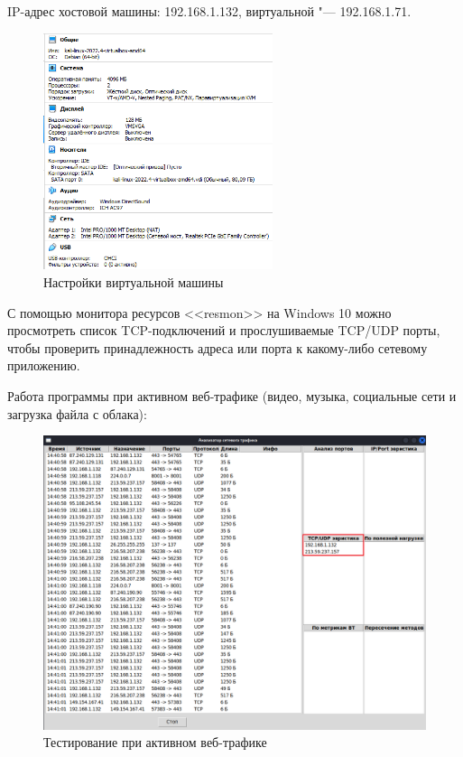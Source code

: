 \documentclass[bachelor, och, coursework]{SCWorks}
\begin{document}
IP-адрес хостовой машины: 192.168.1.132, виртуальной "--- 192.168.1.71.
\begin{figure}[H]
    \centering
    \includegraphics[width=0.6\textwidth]{vbox.png}
    \caption{Настройки виртуальной машины}
\end{figure}

С помощью монитора ресурсов <<resmon>> на Windows 10 можно просмотреть список TCP-подключений и прослушиваемые TCP/UDP порты, чтобы проверить принадлежность адреса или порта к какому-либо сетевому приложению.

Работа программы при активном веб-трафике (видео, музыка, социальные сети и загрузка файла с облака):
\begin{figure}[H]
    \centering
    \includegraphics[width=1\textwidth]{test1.png}
    \caption{Тестирование при активном веб-трафике}
\end{figure}
\end{document}
